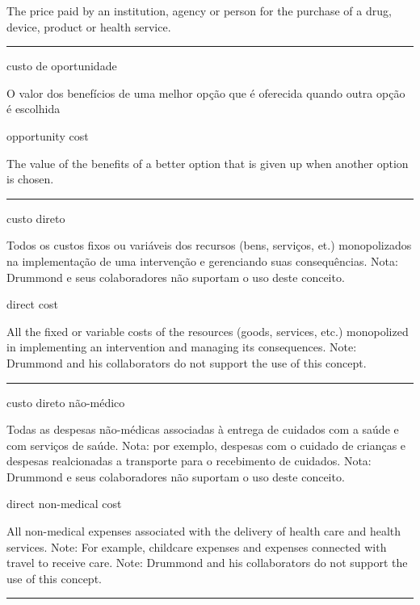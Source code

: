 \documentclass[
  openany]{book}
\begin{document}
The price paid by an institution, agency or person for the purchase of a drug, device, product or health service.

\begin{center}\rule{0.5\linewidth}{0.5pt}\end{center}

custo de oportunidade

O valor dos benefícios de uma melhor opção que é oferecida quando outra opção é escolhida

opportunity cost

The value of the benefits of a better option that is given up when another option is chosen.

\begin{center}\rule{0.5\linewidth}{0.5pt}\end{center}

custo direto

Todos os custos fixos ou variáveis dos recursos (bens, serviços, et.) monopolizados na implementação de uma intervenção e gerenciando suas consequências. Nota: Drummond e seus colaboradores não suportam o uso deste conceito.

direct cost

All the fixed or variable costs of the resources (goods, services, etc.) monopolized in implementing an intervention and managing its consequences. Note: Drummond and his collaborators do not support the use of this concept.

\begin{center}\rule{0.5\linewidth}{0.5pt}\end{center}

custo direto não-médico

Todas as despesas não-médicas associadas à entrega de cuidados com a saúde e com serviços de saúde. Nota: por exemplo, despesas com o cuidado de crianças e despesas realcionadas a transporte para o recebimento de cuidados. Nota: Drummond e seus colaboradores não suportam o uso deste conceito.

direct non-medical cost

All non-medical expenses associated with the delivery of health care and health services. Note: For example, childcare expenses and expenses connected with travel to receive care. Note: Drummond and his collaborators do not support the use of this concept.

\begin{center}\rule{0.5\linewidth}{0.5pt}\end{center}
\end{document}

